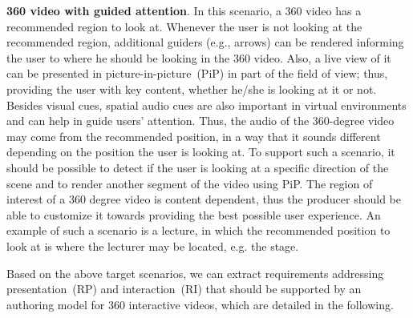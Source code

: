 \textbf{360 video with guided attention}.
In this scenario, a 360 video has a recommended region to look at.
Whenever the user is not looking at the recommended region, additional guiders
(e.g., arrows) can be rendered informing the user to where he should be
looking in the 360 video.
Also, a live view of it can be presented in picture-in-picture~(PiP) in part
of the field of view; thus, providing the user with key content, whether he/she is looking at it or
not.
Besides visual cues, spatial audio cues are also important in virtual
environments and can help in guide users' attention.
Thus, the audio of the 360-degree video may come from the recommended
position, in a way that it sounds different depending on the position the user
is looking at. 
To support such a scenario, it should be possible to detect if the user is
looking at a specific direction of the scene and to render another segment of
the video using PiP.
The region of interest of a 360 degree video is content dependent, thus the
producer should be able to customize it towards providing the best possible
user experience.
An example of such a scenario is a lecture, in which the recommended position
to look at is where the lecturer may be located, e.g. the stage.

Based on the above target scenarios, we can extract requirements addressing
presentation~(RP) and interaction~(RI) that should be
supported by an authoring model for 360 interactive videos, which are detailed
in the following.


